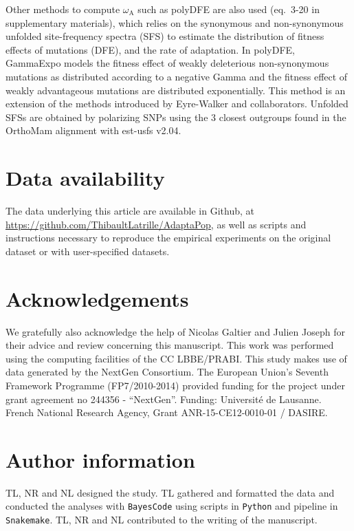 \documentclass{article}
\newcommand{\rateApop}{\omega_{\mathrm{A}}}
\begin{document}
    Other methods to compute $\rateApop$ such as polyDFE\cite{tataru_polydfe_2020} are also used (eq.~3-20 in supplementary materials), which relies on the synonymous and non-synonymous unfolded site-frequency spectra (SFS) to estimate the distribution of fitness effects of mutations (DFE), and the rate of adaptation.
    In polyDFE, GammaExpo models the fitness effect of weakly deleterious non-synonymous mutations as distributed according to a negative Gamma and the fitness effect of weakly advantageous mutations are distributed exponentially.
    This method is an extension of the methods introduced by Eyre-Walker and collaborators\cite{eyre-walker_distribution_2006, eyre-walker_estimating_2009}.
    Unfolded SFSs are obtained by polarizing SNPs using the $3$ closest outgroups found in the OrthoMam alignment with est-usfs v2.04\cite{keightley_inferring_2018}.

    \section{Data availability}\label{sec:data-availability}
    The data underlying this article are available in Github, at \url{https://github.com/ThibaultLatrille/AdaptaPop}, as well as scripts and instructions necessary to reproduce the empirical experiments on the original dataset or with user-specified datasets.

    \section{Acknowledgements}\label{sec:acknowledgements}
    We gratefully also acknowledge the help of Nicolas Galtier and Julien Joseph for their advice and review concerning this manuscript.
    This work was performed using the computing facilities of the CC LBBE/PRABI.
    This study makes use of data generated by the NextGen Consortium.
    The European Union’s Seventh Framework Programme (FP7/2010-2014) provided funding for the project under grant agreement no 244356 - “NextGen”.
    Funding: Université de Lausanne.
    French National Research Agency, Grant ANR-15-CE12-0010-01 / DASIRE.

    \section{Author information}\label{sec:author-information}
    TL, NR and NL designed the study.
    TL gathered and formatted the data and conducted the analyses with \texttt{BayesCode} using scripts in \texttt{Python} and pipeline in \texttt{Snakemake}.
    TL, NR and NL contributed to the writing of the manuscript.

    \printbibliography

\end{document}
